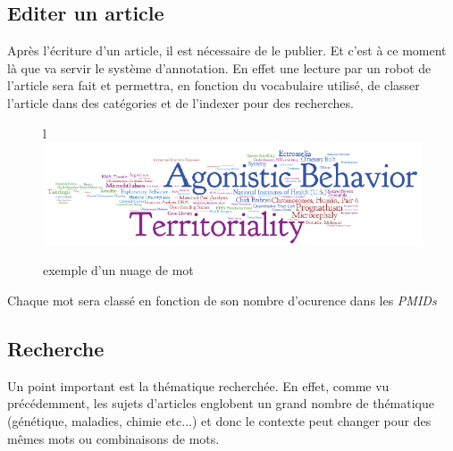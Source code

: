 \subsection{Editer un article}
Après l'écriture d'un article, il est nécessaire de le publier. Et c'est à ce moment là que va servir le système d'annotation. En effet une lecture par un robot de l'article sera fait et permettra, en fonction du vocabulaire utilisé, de classer l'article dans des catégories et de l'indexer pour des recherches.
\\
\begin{figure}{l}{}
\centering
\includegraphics{nuagepoint}
\caption{exemple d'un nuage de mot}
\end{figure}


Chaque mot sera classé en fonction de son nombre d'ocurence dans les \textit{PMIDs}


\subsection{Recherche}
Un point important est la thématique recherchée. En effet, comme vu précédemment, les sujets d'articles englobent un grand nombre de thématique (génétique, maladies, chimie etc...) et donc le contexte peut changer pour des mêmes mots ou combinaisons de mots.
